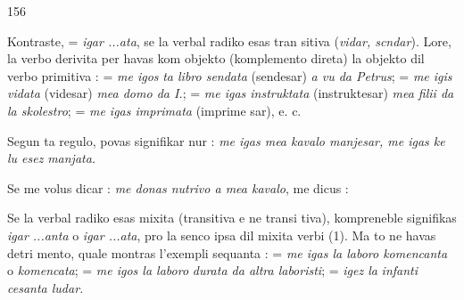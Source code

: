 \begin{VUpage}[160]{156}

Kontraste,  = \textit{igar ...ata}, se la verbal radiko esas tran\cc
sitiva (\textit{vidar, scndar}). Lore, la verbo derivita per  havas\nl
kom objekto (komplemento direta) la objekto dil verbo\nl
primitiva :  = \textit{me igos}\nl
\textit{ta libro sendata} (sendesar) \textit{a vu da Petrus}; \cc
{} = \textit{me igis vidata} (videsar) \textit{mea domo da I.}; \nl
{} = \textit{me igas instruktata}\nl
(instruktesar) \textit{mea filii da la skolestro}; \nl
{} = \textit{me igas imprimata} (imprime\cc
sar), e. c.

Segun ta regulo,  povas signifikar\nl
nur : \textit{me igas mea kavalo manjesar, me igas ke lu esez}\nl
\textit{manjata.}

Se me volus dicar : \textit{me donas nutrivo a mea kavalo}, me\nl
dicus : 

Se la verbal radiko esas mixita (transitiva e ne transi\cc
tiva),  kompreneble signifikas \textit{igar ...anta} o \textit{igar ...ata},\nl
pro la senco ipsa dil mixita verbi (1). Ma to ne havas detri\cc
mento, quale montras l'exempli sequanta : \nl
{} = \textit{me igas la laboro komencanta} o \textit{komencata}; \nl
{} = \textit{me igos la laboro}\nl
\textit{durata da altra laboristi};  = \textit{igez la}\nl
\textit{infanti cesanta ludar.}


\end{VUpage}
